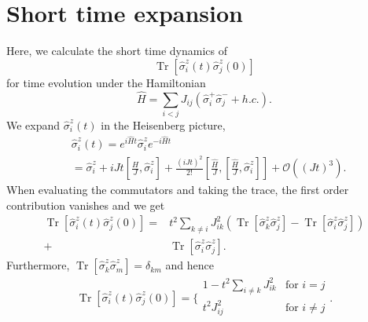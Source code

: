 \documentclass[aps,10pt,reprint,groupedaddress,superscriptaddress]{revtex4-2}
\DeclareMathOperator{\Tr}{Tr}
\begin{document}
\section{Short time expansion}
Here, we calculate the short time dynamics of 
\begin{equation}
\Tr\left[ \hat \sigma^z_i(t) \hat \sigma^z_j (0)\right]
\end{equation}
for time evolution under the Hamiltonian
\begin{equation}
    \hat H= \sum_{i<j} J_{ij} (\hat \sigma^+_i \hat  \sigma^-_j + h.c.).
\end{equation}
 We expand $\hat \sigma^z_i(t)$ in the Heisenberg picture,
\begin{align*}
&\hat \sigma^z_i(t) = e^{i\hat Ht}\hat \sigma^z_i e^{-i\hat Ht}\\
&= \hat \sigma_i^z +iJt\left[ \frac{\hat H}{J},\hat \sigma_i^z\right]+\frac{(iJt)^2}{2!}\left[ \frac{\hat H}{J},\left[  \frac{\hat H}{J},\hat \sigma_i^z\right]\right]+\mathcal{O}((Jt)^3).
\end{align*} 
When evaluating the commutators and taking the trace, the first order contribution vanishes and we get
\begin{align*}
\Tr[ \hat \sigma^z_i(t)\hat \sigma^z_j (0)] =& t^2 \sum_{k\neq i} J_{ik}^2 \left(\Tr[\hat \sigma_k^z \hat \sigma_j^z]-\Tr[\hat \sigma_i^z \hat \sigma_j^z]\right)\\
+&\Tr[\hat \sigma_i^z \hat \sigma_j^z].
\end{align*}
Furthermore, $\Tr[\hat \sigma_k^z \hat \sigma_m^z]=\delta_{km}$ and hence
\begin{equation}
\Tr[ \hat \sigma^z_i(t)\hat \sigma^z_j (0)] = \bigg\{\begin{array}{lr}
        1-t^2\sum_{i\neq k}J_{ik}^2  & \text{for } i=j\\
        t^2J_{ij}^2 & \text{for } i\neq j\\
        \end{array}.
\end{equation}
\end{document}
